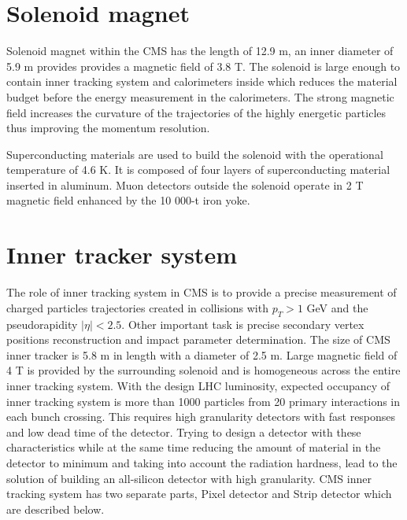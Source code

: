 \section{Solenoid magnet}

Solenoid magnet within the CMS has the length of 12.9 m, an inner diameter of 5.9 m provides provides a magnetic field of 3.8 T. The solenoid is large enough to contain inner tracking system and calorimeters inside which reduces the material budget before the energy measurement in the calorimeters. The strong magnetic field increases the curvature of the trajectories of the highly energetic particles thus improving the momentum resolution.
\par Superconducting materials are used to build the solenoid with the operational temperature of 4.6 K. It is composed of four layers of superconducting material inserted in aluminum. Muon detectors outside the solenoid operate in 2 T magnetic field enhanced by the 10 000-t iron yoke.  


\section{Inner tracker system}

The role of inner tracking system in CMS is to provide a precise measurement of charged particles trajectories created in collisions with $p_T>1$ GeV and the pseudorapidity $|\eta|<2.5$. Other important task is precise secondary vertex positions reconstruction and impact parameter determination. The size of CMS inner tracker is 5.8 m in length with a diameter of 2.5 m. Large magnetic field of 4 T is provided by the surrounding solenoid and is homogeneous across the entire inner tracking system. With the design LHC luminosity, expected occupancy of inner tracking system is more than 1000 particles from 20 primary interactions in each bunch crossing. This requires high granularity detectors with fast responses and low dead time of the detector. Trying to design a detector with these characteristics while at the same time reducing the amount of material in the detector to minimum and taking into account the radiation hardness, lead to the solution of building an all-silicon detector with high granularity. CMS inner tracking system has two separate parts, Pixel detector and Strip detector which are described below.    



